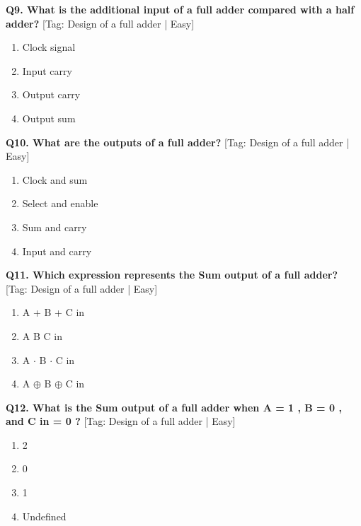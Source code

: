 \noindent\textbf{Q9. What is the additional input of a full adder compared with a half adder?} \hfill [Tag: Design of a full adder | Easy]
\begin{enumerate}[label=(\alph*),topsep=2pt,itemsep=1pt,partopsep=0pt,parsep=0pt]
    \item {Clock signal}
    \item {Input carry}
    \item {Output carry}
    \item {Output sum}
\end{enumerate}
\vspace{2mm}

\noindent\textbf{Q10. What are the outputs of a full adder?} \hfill [Tag: Design of a full adder | Easy]
\begin{enumerate}[label=(\alph*),topsep=2pt,itemsep=1pt,partopsep=0pt,parsep=0pt]
    \item {Clock and sum}
    \item {Select and enable}
    \item {Sum and carry}
    \item {Input and carry}
\end{enumerate}
\vspace{2mm}

\noindent\textbf{Q11. Which expression represents the Sum output of a full adder?} \hfill [Tag: Design of a full adder | Easy]
\begin{enumerate}[label=(\alph*),topsep=2pt,itemsep=1pt,partopsep=0pt,parsep=0pt]
    \item {A + B + C in}
    \item {A B C in}
    \item {A $\cdot$ B $\cdot$ C in}
    \item {A $\oplus$ B $\oplus$ C in}
\end{enumerate}
\vspace{2mm}

\noindent\textbf{Q12. What is the Sum output of a full adder when A = 1 , B = 0 , and C in = 0 ?} \hfill [Tag: Design of a full adder | Easy]
\begin{enumerate}[label=(\alph*),topsep=2pt,itemsep=1pt,partopsep=0pt,parsep=0pt]
    \item {2}
    \item {0}
    \item {1}
    \item {Undefined}
\end{enumerate}
\vspace{2mm}

